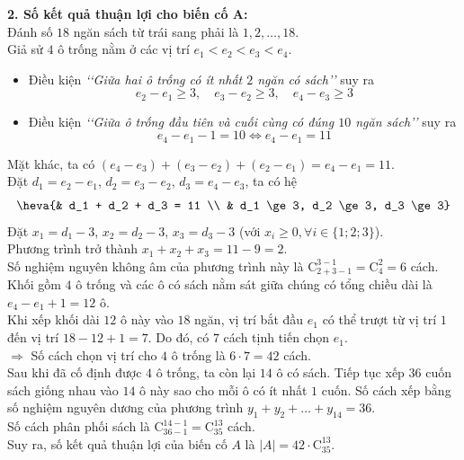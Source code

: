 \begin{ex}
{		\textbf{2. Số kết quả thuận lợi cho biến cố A:} \\
		Đánh số $18$ ngăn sách từ trái sang phải là $1, 2, \dots, 18$. \\
		Giả sử $4$ ô trống nằm ở các vị trí $e_1 < e_2 < e_3 < e_4$.
		\begin{itemize}
			\item Điều kiện \textit{\lq\lq Giữa hai ô trống có ít nhất $2$ ngăn có sách\rq\rq} suy ra 
			\[e_2 - e_1 \ge 3, \quad e_3 - e_2 \ge 3, \quad e_4 - e_3 \ge 3\]
			\item Điều kiện \textit{\lq\lq Giữa ô trống đầu tiên và cuối cùng có đúng $10$ ngăn sách\rq\rq} suy ra 
			\[e_4 - e_1 - 1 = 10 \Leftrightarrow e_4 - e_1 = 11\]
		\end{itemize}
		Mặt khác, ta có $(e_4 - e_3) + (e_3 - e_2) + (e_2 - e_1) = e_4 - e_1 = 11$. \\
		Đặt $d_1 = e_2 - e_1$, $d_2 = e_3 - e_2$, $d_3 = e_4 - e_3$, ta có hệ
		\[ \heva{& d_1 + d_2 + d_3 = 11 \\ & d_1 \ge 3, d_2 \ge 3, d_3 \ge 3} \]
		Đặt $x_1 = d_1 - 3$, $x_2 = d_2 - 3$, $x_3 = d_3 - 3$ (với $x_i \ge 0, \forall i \in \{1; 2; 3\}$). \\
		Phương trình trở thành $x_1 + x_2 + x_3 = 11 - 9 = 2$. \\
		Số nghiệm nguyên không âm của phương trình này là $\mathrm{C}_{2+3-1}^{3-1} = \mathrm{C}_4^2 = 6$ cách. \\
		Khối gồm $4$ ô trống và các ô có sách nằm sát giữa chúng có tổng chiều dài là $e_4 - e_1 + 1 = 12$ ô.\\ 
		Khi xếp khối dài $12$ ô này vào $18$ ngăn, vị trí bắt đầu $e_1$ có thể trượt từ vị trí $1$ đến vị trí $18 - 12 + 1 = 7$. Do đó, có $7$ cách tịnh tiến chọn $e_1$. \\
		$\Rightarrow$ Số cách chọn vị trí cho $4$ ô trống là $6 \cdot 7 = 42$ cách.\\
		Sau khi đã cố định được $4$ ô trống, ta còn lại $14$ ô có sách. Tiếp tục xếp $36$ cuốn sách giống nhau vào $14$ ô này sao cho mỗi ô có ít nhất $1$ cuốn. Số cách xếp bằng số nghiệm nguyên dương của phương trình $y_1 + y_2 + \dots + y_{14} = 36$. \\
		Số cách phân phối sách là $\mathrm{C}_{36-1}^{14-1} = \mathrm{C}_{35}^{13}$ cách. \\
		Suy ra, số kết quả thuận lợi của biến cố $A$ là $|A| = 42 \cdot \mathrm{C}_{35}^{13}$.
		\begin{center}
			\begin{tikzpicture}[xscale=0.85, yscale=0.8, font=\footnotesize]

\end{tikzpicture}
\end{center}}
\end{ex}
